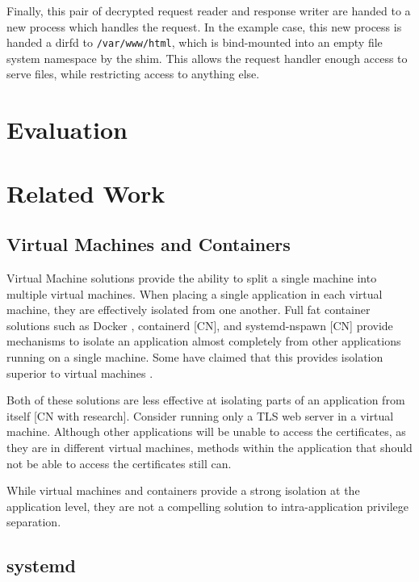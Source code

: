 \documentclass[sigplan]{acmart}
\begin{document}
Finally, this pair of decrypted request reader and response writer are handed to a new process which handles the request. In the example case, this new process is handed a dirfd to \texttt{/var/www/html}, which is bind-mounted into an empty file system namespace by the shim. This allows the request handler enough access to serve files, while restricting access to anything else.


\section{Evaluation}



\section{Related Work}

\subsection{Virtual Machines and Containers}

Virtual Machine solutions \citep{barham_xen_2003,vmware_inc_understanding_2008} provide the ability to split a single machine into multiple virtual machines. When placing a single application in each virtual machine, they are effectively isolated from one another. Full fat container solutions such as Docker \citep{merkel_docker_2014}, containerd [CN], and systemd-nspawn [CN] provide mechanisms to isolate an application almost completely from other applications running on a single machine. Some have claimed that this provides isolation superior to virtual machines \citep{soltesz_container-based_2007}.

Both of these solutions are less effective at isolating parts of an application from itself [CN with research]. Consider running only a TLS web server in a virtual machine. Although other applications will be unable to access the certificates, as they are in different virtual machines, methods within the application that should not be able to access the certificates still can.

While virtual machines and containers provide a strong isolation at the application level, they are not a compelling solution to intra-application privilege separation.

\subsection{systemd}
\end{document}
